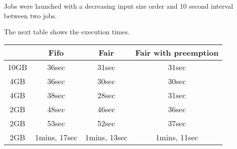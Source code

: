 \documentclass{article}
\begin{document}
Jobs were launched with a decreasing input size order and 10 second interval between two
jobs.


The next table shows the execution times.

\begin{center}
\begin{tabular}{|c|c|c|c|}
\hline
\ & Fifo & Fair & Fair with preemption \\
\hline
10GB & 36sec & 31sec & 31sec \\
\hline
4GB & 36sec & 30sec & 30sec \\
\hline
4GB & 38sec & 28sec & 31sec \\
\hline
2GB & 48sec & 46sec & 36sec \\
\hline
2GB & 53sec & 52sec & 37sec \\
\hline
2GB & 1mins, 17sec & 1mins, 13sec & 1mins, 11sec \\
\hline
\end{tabular}
\end{center}
\end{document}

